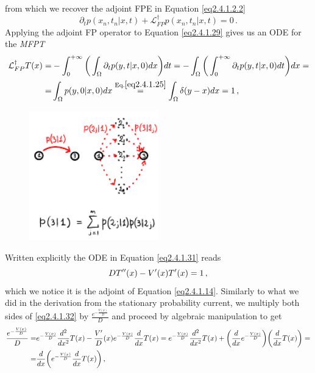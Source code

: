 \documentclass[../main.tex]{subfiles}
\begin{document}
from which we recover the adjoint FPE in Equation \eqref{eq2.4.1.2.2}
\begin{equation*}
     \partial_{t}p(x_{n}, t_{n}|x,t) + \mathcal{L}^{\dagger}_{FP}p(x_{n}, t_{n}|x,t)=0\,.
\end{equation*}
Applying the adjoint FP operator to Equation \eqref{eq2.4.1.29} gives us an ODE for the \textit{MFPT}
\begin{align}
     \mathcal{L}^{\dagger}_{FP}T(x) =& -\int_{0}^{+\infty}\bigg(\int_{\Omega}^{}\partial_{t}p(y,t|x,0)dx\bigg)dt = -\int_{\Omega}^{}\bigg(\int_{0}^{+\infty}\partial_{t}p(y,t|x,0)dt\bigg)dx = \nonumber \\
     =& \int_{\Omega}^{}p(y,0|x,0)dx \stackrel{\text{Eq.}\eqref{eq2.4.1.25}}{=}\int_{\Omega}^{}\delta(y-x)dx = 1  \,, \label{eq2.4.1.31}
\end{align}
\begin{figure}[H]
    \centering 
    \includegraphics[keepaspectratio, width=0.5\textwidth]{../figures/fig2.4.1.3.pdf}
    \caption{}
    \label{fig2.4.1.3}
\end{figure}
Written explicitly the ODE in Equation \eqref{eq2.4.1.31} reads
\begin{equation}\label{eq2.4.1.32}
     D T''(x)-V'(x)T'(x)=1\,,
\end{equation}
which we notice it is the adjoint of Equation \eqref{eq2.4.1.14}.
Similarly to what we did in the derivation from the stationary probability current, we multiply both sides of \eqref{eq2.4.1.32} by $\frac{e^{-\frac{V(x)}{D}}}{D}$ and proceed by algebraic manipulation to get
\begin{align}
     \frac{e^{-\frac{V(x)}{D}}}{D} =& e^{-\frac{V(x)}{D}}\frac{d^{2}}{dx^{2}}T(x) - \frac{V'}{D}(x)e^{-\frac{V(x)}{D}}\frac{d}{dx}T(x) = e^{-\frac{V(x)}{D}}\frac{d^{2}}{dx^{2}}T(x) + \bigg(\frac{d}{dx}e^{-\frac{V(x)}{D}}\bigg)\bigg(\frac{d}{dx}T(x)\bigg) = \nonumber \\
                                   =& \frac{d}{dx}\bigg(e^{-\frac{V(x)}{D}}\frac{d}{dx}T(x)\bigg)\,, \label{eq2.4.1.33}
\end{align}
\end{document}
